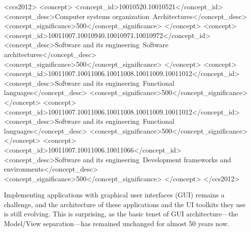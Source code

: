 \documentclass[sigplan,review,screen]{acmart}
\begin{document}
\begin{CCSXML}
<ccs2012>
   <concept>
       <concept_id>10010520.10010521</concept_id>
       <concept_desc>Computer systems organization~Architectures</concept_desc>
       <concept_significance>500</concept_significance>
       </concept>
   <concept>
       <concept_id>10011007.10010940.10010971.10010972</concept_id>
       <concept_desc>Software and its engineering~Software architectures</concept_desc>
       <concept_significance>500</concept_significance>
       </concept>
   <concept>
       <concept_id>10011007.10011006.10011008.10011009.10011012</concept_id>
       <concept_desc>Software and its engineering~Functional languages</concept_desc>
       <concept_significance>500</concept_significance>
       </concept>
   <concept>
       <concept_id>10011007.10011006.10011008.10011009.10011012</concept_id>
       <concept_desc>Software and its engineering~Functional languages</concept_desc>
       <concept_significance>500</concept_significance>
       </concept>
    <concept>
        <concept_id>10011007.10011006.10011066</concept_id>
        <concept_desc>Software and its engineering~Development frameworks and environments</concept_desc>
        <concept_significance>500</concept_significance>
    </concept>
</ccs2012>
\end{CCSXML}



\maketitle

Implementing applications with graphical user interfaces (GUI) remains
a challenge, and the architecture of these applications and the UI
toolkits they use is still evolving.  This is surprising, as the basic
tenet of GUI architecture---the Model/View separation---has remained
unchanged for almost 50 years now.
\end{document}
